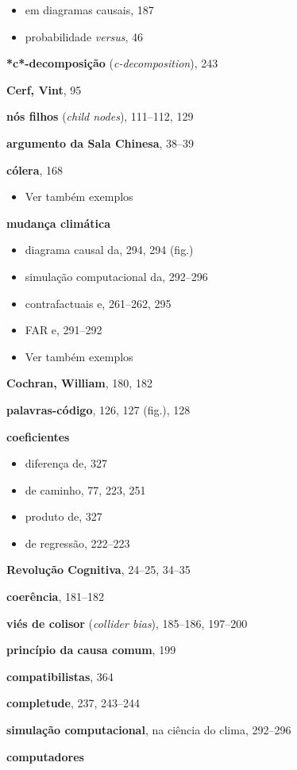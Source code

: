 \documentclass[11pt,a5paper,twoside]{book}
\begin{document}
\begin{itemize}
\item em diagramas causais, 187
\item probabilidade \textit{versus}, 46
\end{itemize}
\textbf{*c*-decomposição} (\textit{c-decomposition}), 243

\textbf{Cerf, Vint}, 95

\textbf{nós filhos} (\textit{child nodes}), 111–112, 129

\textbf{argumento da Sala Chinesa}, 38–39

\textbf{cólera}, 168

\begin{itemize}
\item Ver também exemplos
\end{itemize}
\textbf{mudança climática}

\begin{itemize}
\item diagrama causal da, 294, 294 (fig.)
\item simulação computacional da, 292–296
\item contrafactuais e, 261–262, 295
\item FAR e, 291–292
\item Ver também exemplos
\end{itemize}
\textbf{Cochran, William}, 180, 182

\textbf{palavras-código}, 126, 127 (fig.), 128

\textbf{coeficientes}

\begin{itemize}
\item diferença de, 327
\item de caminho, 77, 223, 251
\item produto de, 327
\item de regressão, 222–223
\end{itemize}
\textbf{Revolução Cognitiva}, 24–25, 34–35

\textbf{coerência}, 181–182

\textbf{viés de colisor} (\textit{collider bias}), 185–186, 197–200

\textbf{princípio da causa comum}, 199

\textbf{compatibilistas}, 364

\textbf{completude}, 237, 243–244

\textbf{simulação computacional}, na ciência do clima, 292–296

\textbf{computadores}
\end{document}
